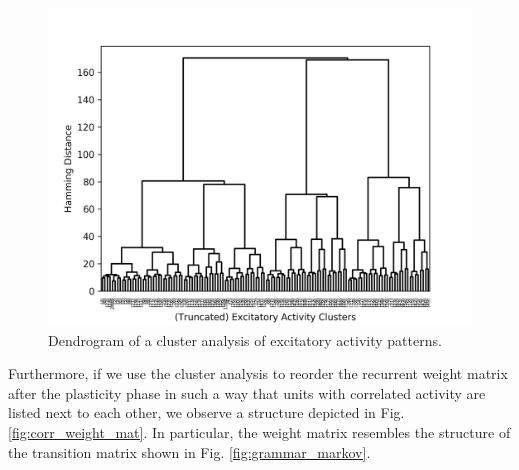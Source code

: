 \documentclass[10pt,a4paper]{article}
\begin{document}
\begin{figure}
\includegraphics[width=\textwidth]{../plots/act_dendrogram.png}
\caption{\label{fig:act_dendrogram} Dendrogram of a cluster analysis of excitatory activity patterns.}
\end{figure}

Furthermore, if we use the cluster analysis to reorder the recurrent weight matrix after the plasticity phase in such a way that units with correlated activity are listed next to each other, we observe a structure depicted in Fig. \ref{fig:corr_weight_mat}. In particular, the weight matrix resembles the structure of the transition matrix shown in Fig. \ref{fig:grammar_markov}.
\end{document}
